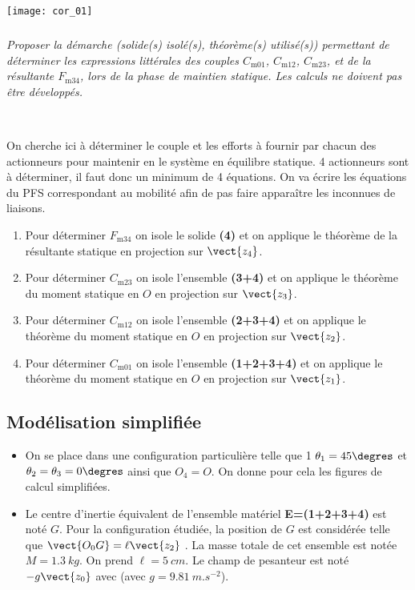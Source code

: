 \begin{multicols}{2}
\begin{corrige}
\begin{center} 
\texttt{[image: cor\_01]}
\end{center}

\end{corrige}
\else
\fi
\subparagraph{}
\textit{Proposer la démarche (solide(s) isolé(s), théorème(s) utilisé(s)) permettant de déterminer les expressions littérales des couples $C_{\text{m01}}$, $C_{\text{m12}}$, $C_{\text{m23}}$,  et de la résultante $F_{\text{m34}}$,  lors de la phase de
maintien statique. Les calculs ne doivent pas être développés.}
\ifprof
\begin{corrige} ~\\

\begin{methode}
On cherche ici à déterminer le couple et les efforts à fournir par chacun des actionneurs pour maintenir en le système en équilibre statique. 4 actionneurs sont à déterminer, il faut donc un minimum de 4 équations. On va écrire les équations du PFS correspondant au mobilité afin de pas faire apparaître les inconnues de liaisons.   
\end{methode}

\begin{enumerate}
\item Pour déterminer $F_{\text{m34}}$ on isole le solide \textbf{(4)} et on applique le théorème de la résultante statique en projection sur $\vect{z_4}$.
\item Pour déterminer $C_{\text{m23}}$ on isole l'ensemble \textbf{(3+4)} et on applique le théorème du moment statique en $O$ en projection sur $\vect{z_3}$.
\item Pour déterminer $C_{\text{m12}}$ on isole l'ensemble \textbf{(2+3+4)} et on applique le théorème du moment statique en $O$ en projection sur $\vect{z_2}$.
\item Pour déterminer $C_{\text{m01}}$ on  isole l'ensemble \textbf{(1+2+3+4)} et on applique le théorème du moment statique en $O$ en projection sur $\vect{z_1}$.
\end{enumerate}
\end{corrige}
\else
\fi

 
 \subsection*{Modélisation simplifiée}
 
 \ifprof
 \else
\begin{itemize}
\item On se place dans une configuration particulière telle que 1 $\theta_1=45\degres$ et $\theta_2=\theta_3=0\degres$ ainsi que $O_4=O$. On donne pour cela les figures de calcul simplifiées.
\item Le centre d’inertie équivalent de l’ensemble matériel \textbf{E=(1+2+3+4)} est noté $G$.
Pour la configuration étudiée, la position de $G$ est considérée telle que $\vect{O_0G}=\ell\vect{z_2}$ . La masse totale de cet ensemble est notée $M=\SI{1,3}{kg}$. On prend $\ell=\SI{5}{cm}$. Le champ de pesanteur est noté $-g\vect{z_0}$ avec (avec $g=\SI{9,81}{m.s^{-2}}$).
\end{itemize}



\end{multicols}
